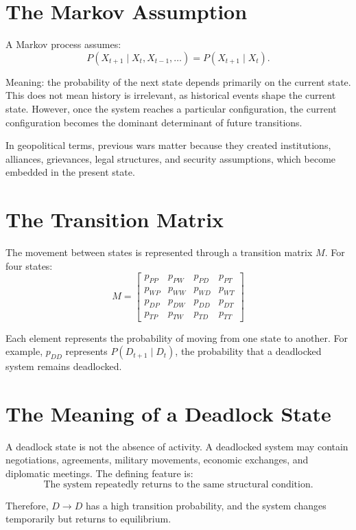 \documentclass[11pt,openany]{book}
\theoremstyle{plain}
\theoremstyle{definition}
\begin{document}
\section*{The Markov Assumption}

A Markov process assumes:
\[
P(X_{t+1} \mid X_t, X_{t-1}, \ldots) = P(X_{t+1} \mid X_t).
\]

Meaning: the probability of the next state depends primarily on the current state. This does not mean history is irrelevant, as historical events shape the current state. However, once the system reaches a particular configuration, the current configuration becomes the dominant determinant of future transitions.

In geopolitical terms, previous wars matter because they created institutions, alliances, grievances, legal structures, and security assumptions, which become embedded in the present state.

\section*{The Transition Matrix}

The movement between states is represented through a transition matrix \(M\). For four states:
\[
M = 
\begin{bmatrix}
p_{PP} & p_{PW} & p_{PD} & p_{PT} \\
p_{WP} & p_{WW} & p_{WD} & p_{WT} \\
p_{DP} & p_{DW} & p_{DD} & p_{DT} \\
p_{TP} & p_{TW} & p_{TD} & p_{TT}
\end{bmatrix}
\]

Each element represents the probability of moving from one state to another. For example, \(p_{DD}\) represents \(P(D_{t+1} \mid D_t)\), the probability that a deadlocked system remains deadlocked.

\section*{The Meaning of a Deadlock State}

A deadlock state is not the absence of activity. A deadlocked system may contain negotiations, agreements, military movements, economic exchanges, and diplomatic meetings. The defining feature is:
\[
\boxed{
\text{The system repeatedly returns to the same structural condition.}
}
\]

Therefore, \(D \to D\) has a high transition probability, and the system changes temporarily but returns to equilibrium.
\end{document}
